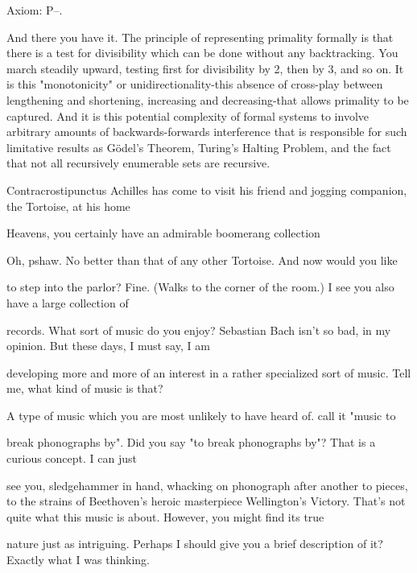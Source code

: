 Axiom: P--. 

And there you have it. The principle of representing primality formally is that there is a test for divisibility which can be done without any backtracking. You march steadily upward, testing first for divisibility by 2, then by 3, and so on. It is this "monotonicity" or unidirectionality-this absence of cross-play between lengthening and shortening, increasing and decreasing-that allows primality to be captured. And it is this potential complexity of formal systems to involve arbitrary amounts of backwards-forwards interference that is responsible for such limitative results as Gödel’s Theorem, Turing's Halting Problem, and the fact that not all recursively enumerable sets are recursive. 







Contracrostipunctus Achilles has come to visit his friend and jogging companion, the Tortoise, at his home 


\achilles Heavens, you certainly have an admirable boomerang collection\par

\tortoise Oh, pshaw. No better than that of any other Tortoise. And now would you like\par
to step into the parlor? 
\achilles Fine. (Walks to the corner of the room.) I see you also have a large collection of\par
records. What sort of music do you enjoy? 
\tortoise Sebastian Bach isn't so bad, in my opinion. But these days, I must say, I am\par
developing more and more of an interest in a rather specialized sort of music. 
\achilles Tell me, what kind of music is that?\par

\tortoise A type of music which you are most unlikely to have heard of. call it "music to\par
break phonographs by". 
\achilles Did you say "to break phonographs by"? That is a curious concept. I can just\par
see you, sledgehammer in hand, whacking on phonograph after another to pieces, to the strains of Beethoven's heroic masterpiece Wellington's Victory. 
\tortoise That's not quite what this music is about. However, you might find its true\par
nature just as intriguing. Perhaps I should give you a brief description of it? 
\achilles Exactly what I was thinking.\par

